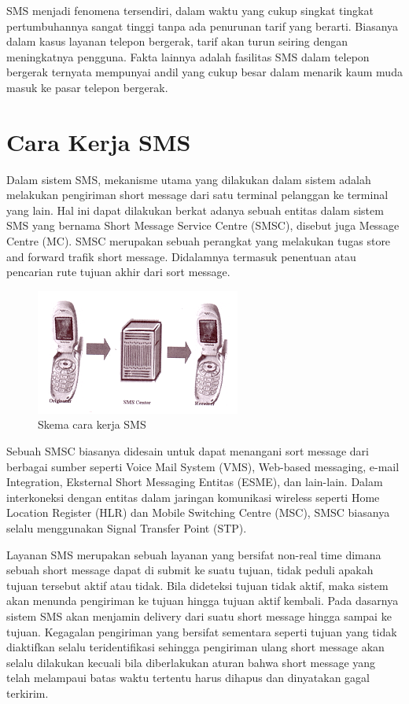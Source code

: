\documentclass{jtetiproposalskripsi}
\begin{document}
SMS menjadi fenomena tersendiri, dalam waktu yang cukup singkat tingkat pertumbuhannya sangat tinggi tanpa ada penurunan tarif yang berarti. Biasanya dalam kasus layanan telepon bergerak, tarif akan turun seiring dengan meningkatnya pengguna. Fakta lainnya adalah fasilitas SMS dalam telepon bergerak ternyata mempunyai andil yang cukup besar dalam menarik kaum muda masuk ke pasar telepon bergerak.

\section{Cara Kerja SMS}

Dalam sistem SMS, mekanisme utama yang dilakukan dalam sistem adalah melakukan pengiriman short message dari satu terminal pelanggan ke terminal yang lain. Hal ini dapat dilakukan berkat adanya sebuah entitas dalam sistem SMS yang bernama Short Message Service Centre (SMSC), disebut juga Message Centre (MC). SMSC merupakan sebuah perangkat yang melakukan tugas store and forward trafik short message. Didalamnya termasuk penentuan atau pencarian rute tujuan akhir dari sort message.

\begin{figure}[ht!]
  \centering
    \includegraphics{gambar/gambar1}
    \caption{Skema cara kerja SMS}
    \label{kerja SMS}
\end{figure}

Sebuah SMSC biasanya didesain untuk dapat menangani  sort message dari berbagai sumber seperti Voice Mail System (VMS), Web-based messaging, e-mail Integration, Eksternal Short Messaging Entitas (ESME), dan lain-lain. Dalam interkoneksi dengan entitas dalam jaringan komunikasi wireless seperti Home Location Register (HLR) dan Mobile Switching Centre (MSC), SMSC biasanya selalu menggunakan Signal Transfer Point (STP).
	
Layanan SMS merupakan sebuah layanan yang bersifat non-real time dimana sebuah short message dapat di submit ke suatu tujuan, tidak peduli apakah tujuan tersebut aktif atau tidak. Bila dideteksi tujuan tidak aktif, maka sistem akan menunda pengiriman ke tujuan hingga tujuan aktif kembali. Pada dasarnya sistem SMS akan menjamin delivery dari suatu short message hingga sampai ke tujuan. Kegagalan pengiriman yang bersifat sementara seperti tujuan yang tidak diaktifkan selalu teridentifikasi sehingga pengiriman ulang short message akan selalu dilakukan kecuali bila diberlakukan aturan bahwa short message yang telah melampaui batas waktu tertentu harus dihapus dan dinyatakan gagal terkirim.
	
\end{document}
